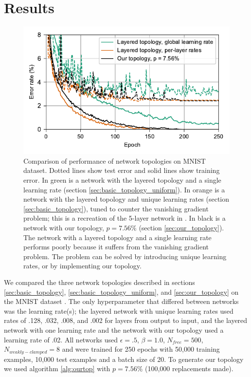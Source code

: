 \documentclass[format=sigconf]{acmart}
\begin{document}
\section{Results}

\begin{figure}
  \centering
  \includegraphics[width=\columnwidth]{figures/MNIST_network_comparison.pdf}
  \caption{Comparison of performance of network topologies on MNIST dataset. Dotted lines show test error and solid lines show training error. In green is a network with the layered topology and a single learning rate (section \ref{sec:basic_topology_uniform}). In orange is a network with the layered topology and unique learning rates (section \ref{sec:basic_topology}), tuned to counter the vanishing gradient problem; this is a recreation of the 5-layer network in \cite{scellier17}. In black is a network with our topology, $p=7.56\%$ (section \ref{sec:our_topology}). The network with a layered topology and a single learning rate performs poorly because it suffers from the vanishing gradient problem. The problem can be solved by introducing unique learning rates, or by implementing our topology.}
  \label{fig:mnist_comparison}
\end{figure}

We compared the three network topologies described in sections \ref{sec:basic_topology}, \ref{sec:basic_topology_uniform}, and \ref{sec:our_topology} on the MNIST dataset \cite{mnist1998}. The only hyperparameter that differed between networks was the learning rate(s); the layered network with unique learning rates used rates of .128, .032, .008, and .002 for layers from output to input, and the layered network with one learning rate and the network with our topology used a learning rate of .02. All networks used $\epsilon=.5$, $\beta=1.0$, $N_{free}=500$, $N_{weakly-clamped}=8$ and were trained for 250 epochs with 50,000 training examples, 10,000 test examples and a batch size of 20. To generate our topology we used algorithm \ref{alg:ourtop} with $p=7.56\%$ (100,000 replacements made).
\end{document}
